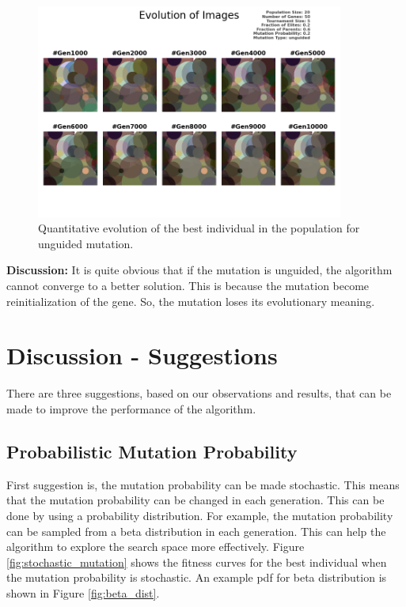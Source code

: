 \documentclass{assignment}
\begin{document}
\begin{figure}[!htb]
    \centering
    \includegraphics[width=0.9\textwidth]{figures/images_output_20_50_5_0.2_0.6_0.2_unguided.png}
    \caption{Quantitative evolution of the best individual in the population for unguided mutation.}
    \label{fig:unguided_image}
\end{figure}

\textbf{Discussion:} It is quite obvious that if the mutation is unguided, the algorithm cannot converge to a better solution. This is because the mutation become reinitialization of the gene. So, the mutation loses its evolutionary meaning.

\section{Discussion - Suggestions}

There are three suggestions, based on our observations and results, that can be made to improve the performance of the algorithm.

\subsection{Probabilistic Mutation Probability}
First suggestion is, the mutation probability can be made stochastic. This means that the mutation probability can be changed in each generation. This can be done by using a probability distribution. For example, the mutation probability can be sampled from a beta distribution in each generation. This can help the algorithm to explore the search space more effectively. Figure \ref{fig:stochastic_mutation} shows the fitness curves for the best individual when the mutation probability is stochastic. An example pdf for beta distribution is shown in Figure \ref{fig:beta_dist}.
\end{document}
